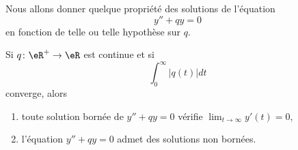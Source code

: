 Nous allons donner quelque propriété des solutions de l'équation
\begin{equation}
    y''+qy=0
\end{equation}
en fonction de telle ou telle hypothèse sur \( q\).

\begin{proposition}
    Si \( q\colon \eR^+\to \eR\) est continue et si
    \begin{equation}
        \int_0^{\infty}| q(t) |dt
    \end{equation}
    converge, alors
    \begin{enumerate}
        \item
            toute solution bornée de \( y''+qy=0\) vérifie \( \lim_{t\to \infty} y'(t)=0\),
        \item
            l'équation \( y''+qy=0\) admet des solutions non bornées.
    \end{enumerate}
\end{proposition}

